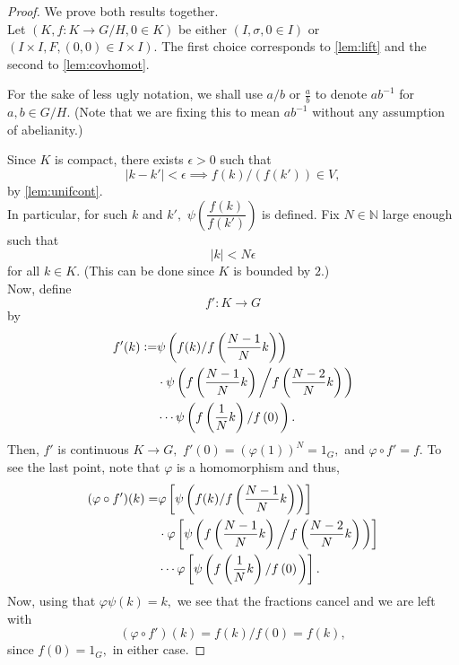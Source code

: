 \documentclass[12pt]{article}
\theoremstyle{definition}
\numberwithin{thm}{section}
\begin{document}
\begin{proof} 
 	We prove both results together.\\
 	Let $(K, f:K\to G/H, 0 \in K)$ be either $(I, \sigma, 0 \in I)$ or $(I \times I, F, (0, 0) \in I \times I).$ The first choice corresponds to \cref{lem:lift} and the second to \cref{lem:covhomot}. 

 	For the sake of less ugly notation, we shall use $a/b$ or $\frac{a}{b}$ to denote $ab^{-1}$ for $a, b \in G/H.$ (Note that we are fixing this to mean $ab^{-1}$ without any assumption of abelianity.)

 	Since $K$ is compact, there exists $\epsilon > 0$ such that 
 	\begin{equation*} 
 		|k - k'| < \epsilon \implies f(k)/(f(k')) \in V,
 	\end{equation*} by \cref{lem:unifcont}.\\
 	In particular, for such $k$ and $k',$ $\psi\left(\dfrac{f(k)}{f(k')}\right)$ is defined. Fix $N \in \mathbb{N}$ large enough such that
 	\begin{equation*} 
 		|k| < N\epsilon
 	\end{equation*}
 	for all $k \in K.$ (This can be done since $K$ is bounded by $2$.)\\
 	Now, define
 	\begin{equation*} 
 		f':K \to G
 	\end{equation*}
 	by
 	\begin{align*} 
 		f'(k) \vcentcolon= &\psi\left(f(k)/f\left(\dfrac{N-1}{N}k\right)\right)\\
 		& \cdot \psi\left(f\left(\dfrac{N-1}{N}k\right)\left/f\left(\dfrac{N-2}{N}k\right)\right.\right)\\
 		& \cdots \psi\left(f\left(\dfrac{1}{N}k\right)\left/f\left(0\right)\right.\right).
 	\end{align*}
 	Then, $f'$ is continuous $K \to G,$ $f'(0) = (\varphi(1))^N = 1_G,$ and $\varphi\circ f' = f.$ To see the last point, note that $\varphi$ is a homomorphism and thus,
 	\begin{align*} 
 		(\varphi\circ f')(k) = &\varphi\left[\psi\left(f(k)/f\left(\dfrac{N-1}{N}k\right)\right)\right]\\
 		& \cdot \varphi\left[\psi\left(f\left(\dfrac{N-1}{N}k\right)\left/f\left(\dfrac{N-2}{N}k\right)\right.\right)\right]\\
 		& \cdots \varphi\left[\psi\left(f\left(\dfrac{1}{N}k\right)\left/f\left(0\right)\right.\right)\right].
 	\end{align*}
 	Now, using that $\varphi\psi(k) = k,$ we see that the fractions cancel and we are left with
 	\begin{equation*} 
 		(\varphi\circ f')(k) = f(k)/f(0) = f(k),
 	\end{equation*}
 	since $f(0) = 1_G,$ in either case.


\end{proof}
\end{document}
